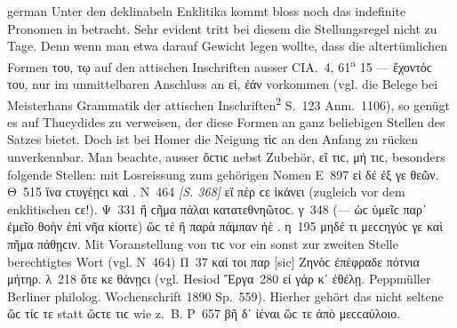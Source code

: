 \begin{otherlanguage*}{german}
Unter den deklinabeln Enklitika kommt bloss noch das indefinite Pronomen in betracht. Sehr evident tritt bei diesem die Stellungsregel nicht zu Tage. Denn wenn man etwa darauf Gewicht legen wollte, dass die altertümlichen Formen του, τῳ auf den attischen Inschriften ausser CIA.~4, 61\textsuperscript{a} 15 — ἔχοντόϲ του, nur im unmittelbaren Anschluss an εἰ, ἐάν vorkommen (vgl. die Belege bei Meisterhans Grammatik der attischen Inschriften\textsuperscript{2} S.~123 Anm.~1106), so genügt es auf Thucydides zu verweisen, der diese Formen an ganz beliebigen Stellen des Satzes bietet. Doch ist bei Homer die Neigung τὶϲ an den Anfang zu rücken unverkennbar. Man beachte, ausser ὅϲτιϲ nebst Zubehör, εἴ τιϲ, μή τιϲ, besonders folgende Stellen: mit Losreissung zum gehörigen Nomen Ε~897 εἰ δέ  ἐξ  γε θεῶν. Θ~515 ἵνα  ϲτυγέῃϲι καὶ . Ν~464 \hypertarget{p368}{\emph{[S. 368]}}\label{p368} εἴ πέρ  ϲε  ἱκάνει (zugleich vor dem enklitischen ϲε!). Ψ~331 ἤ  ϲῆμα  πάλαι κατατεθνηῶτοϲ. γ~348 (— ὡϲ ὑμεῖϲ παρ᾽ ἐμεῖο θοὴν ἐπὶ νῆα κίοιτε) ὥϲ τέ  ἢ παρὰ πάμπαν  ἠὲ . η~195 μηδέ τι μεϲϲηγύϲ γε  καὶ πῆμα πάθῃϲιν. Mit Voranstellung von τιϲ vor ein sonst zur zweiten Stelle berechtigtes Wort (vgl. Ν~464) Π~37 καί  τοι παρ [sic] Ζηνὸϲ ἐπέφραδε πότνια μήτηρ. λ~218 ὅτε  κε θάνῃϲι (vgl. Hesiod Ἔργα~280 εἰ γάρ  κ᾽ ἐθέλῃ. Peppmüller Berliner philolog. Wochenschrift 1890 Sp.~559). Hierher gehört das nicht seltene ὥϲ τίϲ τε statt ὥϲτε τιϲ  wie z.~B. Ρ~657 βῆ δ᾽ ἰέναι ὥϲ  τε  ἀπὸ μεϲϲαύλοιο.


\end{otherlanguage*}
